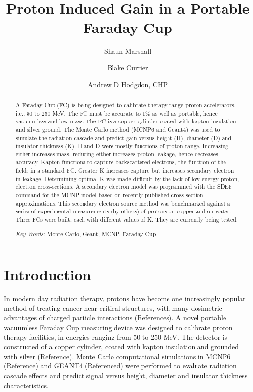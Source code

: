 \documentclass{mc2015}
\begin{document}
\title{Proton Induced Gain in a Portable Faraday Cup}

\author{Shaun Marshall}
\author{Blake Currier}

\author{Andrew D Hodgdon, CHP}

\maketitle

\begin{abstract}
A Faraday Cup (FC) is being designed to calibrate therapy-range proton accelerators, i.e., 50 to 250 MeV. The FC must be accurate to 1\% as well as portable, hence vacuum-less and low mass. The FC is a copper cylinder coated with kapton insulation and silver ground. The Monte Carlo method (MCNP6 and Geant4) was used to simulate the radiation cascade and predict gain versus height (H), diameter (D) and insulator thickness (K). H and D were mostly functions of proton range. Increasing either increases mass, reducing either increases proton leakage, hence decreases accuracy. Kapton functions to capture backscattered electrons, the function of the fields in a standard FC. Greater K increases capture but increases secondary electron in-leakage. Determining optimal K was made difficult by the lack of low energy proton, electron cross-sections. A secondary electron model was programmed with the SDEF command for the MCNP model based on recently published cross-section approximations. This secondary electron source method was benchmarked against a series of experimental measurements (by others) of protons on copper and on water. Three FCs were built, each with different values of K. They are currently being tested. 

\emph{Key Words}: Monte Carlo, Geant, MCNP, Faraday Cup
\end{abstract}

\section{Introduction}

In modern day radiation therapy, protons have become one increasingly popular method of treating cancer near critical structures, with many dosimetric advantages of charged particle interactions (References). A novel portable vacuumless Faraday Cup measuring device was designed to calibrate proton therapy facilities, in energies ranging from 50 to 250 MeV. The detector is constructed of a copper cylinder, coated with kapton insulation and grounded with silver (Reference). Monte Carlo computational simulations in MCNP6 (Reference) and GEANT4 (Referenced) were performed to evaluate radiation cascade effects and predict signal versus height, diameter and insulator thickness characteristics.
\end{document}
